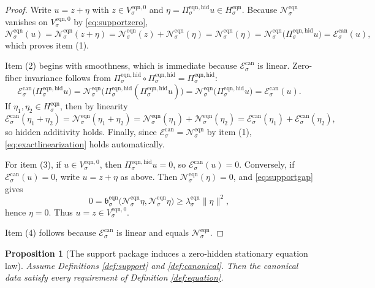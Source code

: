 \documentclass[11pt]{article}
\newcommand{\EqnPair}[1]{\mathfrak b_{#1}^{\mathrm{eqn}}}
\newcommand{\EqnResidualCan}[1]{\mathcal E_{#1}^{\mathrm{can}}}
\newcommand{\EqnZero}[1]{V_{#1}^{\mathrm{eqn},0}}
\newcommand{\EqnHidden}[1]{H_{#1}^{\mathrm{eqn}}}
\newcommand{\EqnProj}[1]{\Pi_{#1}^{\mathrm{eqn,hid}}}
\newcommand{\EqnLin}[1]{\mathcal N_{#1}^{\mathrm{eqn}}}
\newtheorem{proposition}{Proposition}
\begin{document}
\begin{proof}
Write \(u=z+\eta\) with \(z\in\EqnZero{\sigma}\) and \(\eta=\EqnProj{\sigma}u\in\EqnHidden{\sigma}\). Because \(\EqnLin{\sigma}\) vanishes on \(\EqnZero{\sigma}\) by \eqref{eq:supportzero},
\[
\EqnLin{\sigma}(u)
=
\EqnLin{\sigma}(z+\eta)
=
\EqnLin{\sigma}(z)+\EqnLin{\sigma}(\eta)
=
\EqnLin{\sigma}(\eta)
=
\EqnLin{\sigma}\bigl(\EqnProj{\sigma}u\bigr)
=
\EqnResidualCan{\sigma}(u),
\]
which proves item (1).

Item (2) begins with smoothness, which is immediate because \(\EqnResidualCan{\sigma}\) is linear. Zero-fiber invariance follows from \(\EqnProj{\sigma}\circ\EqnProj{\sigma}=\EqnProj{\sigma}\):
\[
\EqnResidualCan{\sigma}\bigl(\EqnProj{\sigma}u\bigr)
=
\EqnLin{\sigma}\bigl(\EqnProj{\sigma}(\EqnProj{\sigma}u)\bigr)
=
\EqnLin{\sigma}\bigl(\EqnProj{\sigma}u\bigr)
=
\EqnResidualCan{\sigma}(u).
\]
If \(\eta_{1},\eta_{2}\in\EqnHidden{\sigma}\), then by linearity
\[
\EqnResidualCan{\sigma}(\eta_{1}+\eta_{2})
=
\EqnLin{\sigma}(\eta_{1}+\eta_{2})
=
\EqnLin{\sigma}(\eta_{1})+\EqnLin{\sigma}(\eta_{2})
=
\EqnResidualCan{\sigma}(\eta_{1})+\EqnResidualCan{\sigma}(\eta_{2}),
\]
so hidden additivity holds. Finally, since \(\EqnResidualCan{\sigma}=\EqnLin{\sigma}\) by item (1), \eqref{eq:exactlinearization} holds automatically.

For item (3), if \(u\in\EqnZero{\sigma}\), then \(\EqnProj{\sigma}u=0\), so \(\EqnResidualCan{\sigma}(u)=0\). Conversely, if \(\EqnResidualCan{\sigma}(u)=0\), write \(u=z+\eta\) as above. Then \(\EqnLin{\sigma}(\eta)=0\), and \eqref{eq:supportgap} gives
\[
0
=
\EqnPair{\sigma}\bigl(\EqnLin{\sigma}\eta,\EqnLin{\sigma}\eta\bigr)
\ge
\lambda_{\sigma}^{\mathrm{eqn}}\|\eta\|^{2},
\]
hence \(\eta=0\). Thus \(u=z\in\EqnZero{\sigma}\).

Item (4) follows because \(\EqnResidualCan{\sigma}\) is linear and equals \(\EqnLin{\sigma}\).
\end{proof}

\begin{proposition}[The support package induces a zero-hidden stationary equation law]
\label{prop:equation}
Assume Definitions \ref{def:support} and \ref{def:canonical}. Then the canonical data satisfy every requirement of Definition \ref{def:equation}.
\end{proposition}
\end{document}

